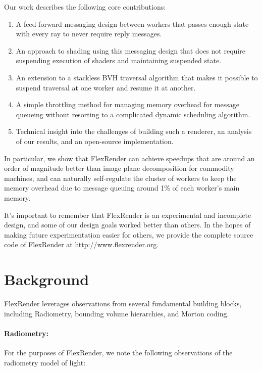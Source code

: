\documentclass[a4paper,twoside]{article}
\begin{document}
Our work describes the following core contributions:

\begin{enumerate}
    \item A feed-forward messaging design between workers that passes enough
        state with every ray to never require reply messages.
    \item An approach to shading using this messaging design that does not
        require suspending execution of shaders and maintaining suspended state.
    \item An extension to a stackless BVH traversal algorithm \cite{hapala:2011}
        that makes it possible to suspend traversal at one worker and resume it
        at another.
    \item A simple throttling method for managing memory overhead for message
        queueing without resorting to a complicated dynamic scheduling algorithm.
    \item Technical insight into the challenges of building such a renderer, an
        analysis of our results, and an open-source implementation.
\end{enumerate}

In particular, we show that FlexRender can achieve speedups that are around an
order of magnitude better than image plane decomposition for commodity machines,
and can naturally self-regulate the cluster of workers to keep the memory
overhead due to message queuing around 1\% of each worker's main memory.

It's important to remember that FlexRender is an experimental and incomplete
design, and some of our design goals worked better than others. In the hopes of
making future experimentation easier for others, we provide the complete
source code of FlexRender at http://www.flexrender.org.

\section{Background}
\label{background}

FlexRender leverages observations from several fundamental building blocks,
including Radiometry, bounding volume hierarchies, and Morton coding.

\paragraph{Radiometry:}
For the purposes of FlexRender, we note the following observations of the
radiometry model of light:
\end{document}

